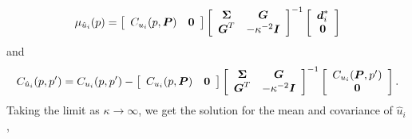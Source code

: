 \documentclass[extra,mreferee]{gji}
\begin{document}
 \begin{equation}\label{eq:PosteriorMean2}
\mu_{\hat{u}_i}(p) = \left[\begin{array}{cc}
                         C_{u_i}(p,\mitbf{P}) & \mitbf{0} \\
                         \end{array}\right]
                   \left[\begin{array}{cc}
                         \mitbf{\Sigma} & \mitbf{G} \\
                         \mitbf{G}^T  & -\kappa^{-2} \mitbf{I} \\
                         \end{array}\right]^{-1}
                   \left[\begin{array}{c}
                         \mitbf{d}^*_i \\
                         \mitbf{0} \\
                         \end{array}\right]
\end{equation}    
and
\begin{equation}\label{eq:PosteriorCov2}
C_{\hat{u}_i}(p,p') = C_{u_i}(p,p') - 
                    \left[\begin{array}{cc}
                          C_{u_i}(p,\mitbf{P}) & \mitbf{0} \\
                          \end{array}\right]
                    \left[\begin{array}{cc}
                          \mitbf{\Sigma} & \mitbf{G} \\
                          \mitbf{G}^T  & -\kappa^{-2} \mitbf{I} \\
                          \end{array}\right]^{-1}
                    \left[\begin{array}{c}
                          C_{u_i}(\mitbf{P},p') \\
                          \mitbf{0} \\
                          \end{array}\right].
\end{equation}
Taking the limit as $\kappa \to \infty$, we get the solution for the mean and covariance of $\hat{u}_i$,
\end{document}
